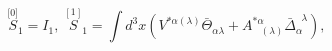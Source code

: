 \begin{equation}
\stackrel{\lbrack 0]}{S}_{1}=I_{1},\;\stackrel{[1]}{S}_{1}=\int d^{3}x\left(
V^{*\alpha (\lambda )}\bar{\Theta}_{\alpha \lambda }+A_{\;\;\;(\lambda
)}^{*\alpha }\bar{\Delta}_{\alpha }^{\;\;\lambda }\right) ,  \label{bf56}
\end{equation}

